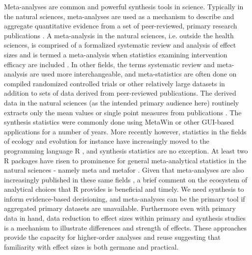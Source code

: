 Meta-analyses are common and powerful synthesis tools in science.  Typically in the natural sciences, meta-analyses are used as a mechanism to describe and aggregate quantitative evidence from a set of peer-reviewed, primary research publications \citep{RN3629, RN4850}.  A meta-analysis in the natural sciences, i.e. outside the health sciences, is comprised of a formalized systematic review and analysis of effect sizes and is termed a meta-analysis when statistics examining intervention efficacy are included \citep{RN3216}.  In other fields, the terms systematic review and meta-analysis are used more interchangeable, and meta-statistics are often done on compiled randomized controlled trials or other relatively large datasets in addition to sets of data derived from peer-reviewed publications.  The derived data in the natural sciences (as the intended primary audience here) routinely extracts only the mean values or single point measures from publications \citep{RN4861}.  The synthesis statistics were commonly done using MetaWin \citep{RN6194} or other GUI-based applications for a number of years.  More recently however, statistics in the fields of ecology and evolution for instance have increasingly moved to the programming language R \citep{RN6098}, and synthesis statistics are no exception.  At least two R packages have risen to prominence for general meta-analytical statistics in the natural sciences - namely meta \citep{RN6176} and metafor \citep{RN6175}.  Given that meta-analyses are also increasingly published in these same fields \citep{RN2189, RN3629}, a brief comment on the ecosystem of analytical choices that R provides is beneficial and timely.  We need synthesis to inform evidence-based decisioning, and meta-analyses can be the primary tool if aggregated primary datasets are unavailable.  Furthermore even with primary data in hand, data reduction to effect sizes within primary and synthesis studies is a mechanism to illustrate differences and strength of effects.  These approaches provide the capacity for higher-order analyses and reuse \citep{RN4835} suggesting that familiarity with effect sizes is both germane and practical.

